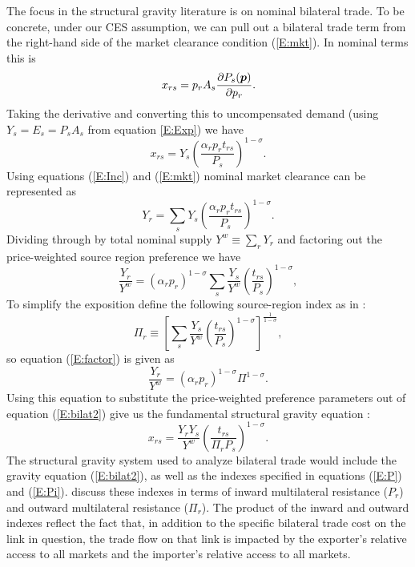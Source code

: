 \documentclass{ejb}
\newcommand{\pv}{\mbox{\boldmath$p$}}
\begin{document}
The focus in the structural gravity literature is on nominal
bilateral trade. To be concrete, under our CES assumption, we can pull
out a bilateral trade term from the right-hand side of the market
clearance condition (\ref{E:mkt}).  In nominal terms this is
\begin{equation}
\label{E:bilat1}
x_{rs} = p_r A_s \frac{\partial P_s(\pv)}{\partial p_r}.
\end{equation}
Taking the derivative and converting this to uncompensated demand
(using $Y_s = E_s = P_s A_s$ from equation \ref{E:Exp}) we have 
\begin{equation}
\label{E:bilat2}
x_{rs} = Y_s \left(\frac{\alpha_r p_r t_{rs}}{P_s}\right)^{1-\sigma}.
\end{equation}
Using equations (\ref{E:Inc}) and (\ref{E:mkt}) nominal market
clearance can be represented as 
\begin{equation}
\label{E:nommkt}
Y_r = \sum_s Y_s \left(\frac{\alpha_r p_r t_{rs}}{P_s}\right)^{1-\sigma}.
\end{equation}
Dividing through by total nominal supply $Y^w \equiv \sum_r Y_r$ and
factoring out the price-weighted source region preference we have
\begin{equation}
\label{E:factor}
\frac{Y_r}{Y^w} = (\alpha_r p_r)^{1-\sigma} \sum_s \frac{Y_s}{Y^w} \left(\frac{
t_{rs}}{P_s}\right)^{1-\sigma},
\end{equation}
To simplify the exposition define the following source-region index as in
\citet{AvW}:  
\begin{equation}
\label{E:Pi}
\Pi_r \equiv \left[\sum_s \frac{Y_s}{Y^w}
\left(\frac{t_{rs}}{P_s}\right)^{1-\sigma}\right]^{\frac{1}{1-\sigma}},
\end{equation}
so equation (\ref{E:factor}) is given as 
\begin{equation}
\label{E:factor2}
\frac{Y_r}{Y^w} = (\alpha_r p_r)^{1-\sigma} \Pi^{1-\sigma}.
\end{equation}
Using this equation to substitute the price-weighted preference
parameters out of equation (\ref{E:bilat2}) give us the fundamental
structural gravity equation \citep{AvW}:
\begin{equation}
\label{E:bilat3}
x_{rs} = \frac{Y_r Y_s}{Y^w} \left(\frac{t_{rs}}{\Pi_r P_s}\right)^{1-\sigma}.
\end{equation}
The structural gravity system used to analyze bilateral trade would
include the gravity equation (\ref{E:bilat2}), as well as the indexes
specified in equations (\ref{E:P}) and (\ref{E:Pi}).  \citet{AvW}
discuss these indexes in terms of inward multilateral resistance
($P_r$) and outward multilateral resistance ($\Pi_r$).  The product of
the inward and outward indexes reflect the fact that, in addition to
the specific bilateral trade cost on the link in question, the trade
flow on that link is impacted by the exporter's relative access to
all markets and the importer's relative access to all markets. 
\end{document}
